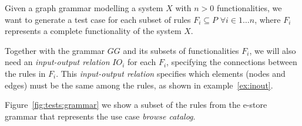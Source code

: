 Given a graph grammar \graphGrammar{} modelling a system $X$ with $n > 0$ functionalities, we want to generate a test case for each subset of rules $F_i \subseteq P$ $\forall i \in 1\ldots n$, where $F_i$ represents a complete functionality  of the system $X$.

Together with the grammar $GG$ and its subsets of functionalities $F_i$, we will also need an \emph{input-output relation} $IO_i$ for each $F_i$, specifying the connections between the rules in $F_i$. This \emph{input-output relation} specifies which elements (nodes and edges) must be the same among the rules, as shown in example~\ref{ex:inout}.

\begin{example} Figure~\ref{fig:tests:grammar} we show a subset of the rules from the e-store grammar that represents the use case \emph{browse catalog}. 


\end{example}
